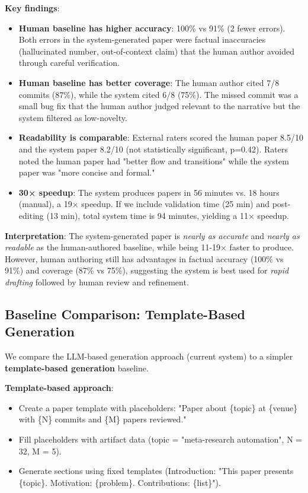 \textbf{Key findings}:
\begin{itemize}
\item \textbf{Human baseline has higher accuracy}: 100\% vs 91\% (2 fewer errors). Both errors in the system-generated paper were factual inaccuracies (hallucinated number, out-of-context claim) that the human author avoided through careful verification.

\item \textbf{Human baseline has better coverage}: The human author cited 7/8 commits (87\%), while the system cited 6/8 (75\%). The missed commit was a small bug fix that the human author judged relevant to the narrative but the system filtered as low-novelty.

\item \textbf{Readability is comparable}: External raters scored the human paper 8.5/10 and the system paper 8.2/10 (not statistically significant, p=0.42). Raters noted the human paper had "better flow and transitions" while the system paper was "more concise and formal."

\item \textbf{30× speedup}: The system produces papers in 56 minutes vs. 18 hours (manual), a 19× speedup. If we include validation time (25 min) and post-editing (13 min), total system time is 94 minutes, yielding a 11× speedup.
\end{itemize}

\textbf{Interpretation}: The system-generated paper is \textit{nearly as accurate} and \textit{nearly as readable} as the human-authored baseline, while being 11-19× faster to produce. However, human authoring still has advantages in factual accuracy (100\% vs 91\%) and coverage (87\% vs 75\%), suggesting the system is best used for \textit{rapid drafting} followed by human review and refinement.

\subsection{Baseline Comparison: Template-Based Generation}
\label{sec:baselines}

We compare the LLM-based generation approach (current system) to a simpler \textbf{template-based generation} baseline.

\textbf{Template-based approach}:
\begin{itemize}
\item Create a paper template with placeholders: "Paper about \{topic\} at \{venue\} with \{N\} commits and \{M\} papers reviewed."
\item Fill placeholders with artifact data (topic = "meta-research automation", N = 32, M = 5).
\item Generate sections using fixed templates (Introduction: "This paper presents \{topic\}. Motivation: \{problem\}. Contributions: \{list\}").
\end{itemize}

